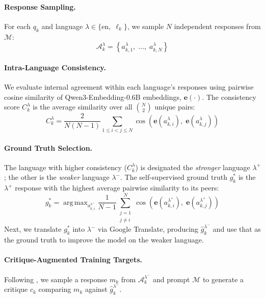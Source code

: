\documentclass[11pt]{article}
\DeclareMathOperator*{\argmax}{arg\,max}
\begin{document}
\paragraph{Response Sampling.} For each $q_k$ and language $\lambda \in \{\text{en},\; \ell_k\}$, we sample $N$ independent responses from $\mathcal{M}$:
\begin{equation}
    \mathcal{A}_k^{\lambda} = \left\{ a_{k,1}^{\lambda},\; \ldots,\; a_{k,N}^{\lambda} \right\}
\end{equation}

\paragraph{Intra-Language Consistency.} We evaluate internal agreement within each language's responses using pairwise cosine similarity of Qwen3-Embedding-0.6B \cite{qwen3embedding} embeddings, $\mathbf{e}(\cdot)$. The consistency score $C_k^{\lambda}$ is the average similarity over all $\binom{N}{2}$ unique pairs:
\begin{equation}
    C_k^{\lambda} = \frac{2}{N(N-1)} \sum_{1 \leq i < j \leq N} \cos\!\left( \mathbf{e}(a_{k,i}^{\lambda}),\; \mathbf{e}(a_{k,j}^{\lambda}) \right)
\end{equation}

\paragraph{Ground Truth Selection.} The language with higher consistency ($C_k^{\lambda}$) is designated the \textit{stronger} language $\lambda^{+}$; the other is the \textit{weaker} language $\lambda^{-}$. The self-supervised ground truth $g_k^{*}$ is the $\lambda^{+}$ response with the highest average pairwise similarity to its peers:
\begin{equation}
    g_k^{*} = \argmax_{a_{k,i}^{\lambda^{+}}} \frac{1}{N-1} \sum_{\substack{j=1 \\ j \neq i}}^{N} \cos\!\left( \mathbf{e}(a_{k,i}^{\lambda^{+}}),\; \mathbf{e}(a_{k,j}^{\lambda^{+}}) \right)
\end{equation}
Next, we translate $g_k^{*}$ into $\lambda^{-}$ via Google Translate, producing $\hat{g}_k^{\lambda^{-}}$ and use that as the ground truth to improve the model on the weaker language.

\paragraph{Critique-Augmented Training Targets.} Following \cite{feng-etal-2025-culfit}, we sample a response $m_k$ from $\mathcal{A}_k^{\lambda^{-}}$ and prompt $\mathcal{M}$ to generate a critique $c_k$ comparing $m_k$ against $\hat{g}_k^{\lambda^{-}}$.
\end{document}
